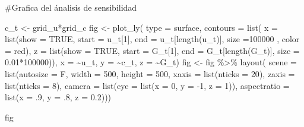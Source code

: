 \documentclass[
  us-letterpaper,
]{scrreprt}
\newenvironment{Shaded}{\begin{snugshade}}{\end{snugshade}}
\newcommand{\AttributeTok}[1]{\textcolor[rgb]{0.40,0.45,0.13}{#1}}
\newcommand{\CommentTok}[1]{\textcolor[rgb]{0.37,0.37,0.37}{#1}}
\newcommand{\ConstantTok}[1]{\textcolor[rgb]{0.56,0.35,0.01}{#1}}
\newcommand{\DecValTok}[1]{\textcolor[rgb]{0.68,0.00,0.00}{#1}}
\newcommand{\FloatTok}[1]{\textcolor[rgb]{0.68,0.00,0.00}{#1}}
\newcommand{\FunctionTok}[1]{\textcolor[rgb]{0.28,0.35,0.67}{#1}}
\newcommand{\NormalTok}[1]{\textcolor[rgb]{0.00,0.23,0.31}{#1}}
\newcommand{\OtherTok}[1]{\textcolor[rgb]{0.00,0.23,0.31}{#1}}
\newcommand{\SpecialCharTok}[1]{\textcolor[rgb]{0.37,0.37,0.37}{#1}}
\newcommand{\StringTok}[1]{\textcolor[rgb]{0.13,0.47,0.30}{#1}}
\theoremstyle{plain}
\theoremstyle{plain}
\theoremstyle{definition}
\theoremstyle{remark}
\begin{document}
\begin{Shaded}
\begin{Highlighting}[]
\CommentTok{\#Grafica del ánalisis de sensibilidad}

\NormalTok{c\_t }\OtherTok{\textless{}{-}}\NormalTok{ grid\_u}\SpecialCharTok{*}\NormalTok{grid\_c}
\NormalTok{fig }\OtherTok{\textless{}{-}} \FunctionTok{plot\_ly}\NormalTok{(}
  \AttributeTok{type =} \StringTok{\textquotesingle{}surface\textquotesingle{}}\NormalTok{,}
  \AttributeTok{contours =} \FunctionTok{list}\NormalTok{(}
    \AttributeTok{x =} \FunctionTok{list}\NormalTok{(}\AttributeTok{show =} \ConstantTok{TRUE}\NormalTok{, }\AttributeTok{start =}\NormalTok{ u\_t[}\DecValTok{1}\NormalTok{], }
             \AttributeTok{end =}\NormalTok{ u\_t[}\FunctionTok{length}\NormalTok{(u\_t)], }
             \AttributeTok{size =}\DecValTok{100000}\NormalTok{ , }\AttributeTok{color =} \StringTok{\textquotesingle{}red\textquotesingle{}}\NormalTok{),}
    \AttributeTok{z =} \FunctionTok{list}\NormalTok{(}\AttributeTok{show =} \ConstantTok{TRUE}\NormalTok{, }\AttributeTok{start =}\NormalTok{ G\_t[}\DecValTok{1}\NormalTok{], }
             \AttributeTok{end =}\NormalTok{ G\_t[}\FunctionTok{length}\NormalTok{(G\_t)], }
             \AttributeTok{size =} \FloatTok{0.01}\SpecialCharTok{*}\DecValTok{100000}\NormalTok{)),}
  \AttributeTok{x =} \SpecialCharTok{\textasciitilde{}}\NormalTok{u\_t,}
  \AttributeTok{y =} \SpecialCharTok{\textasciitilde{}}\NormalTok{c\_t,}
  \AttributeTok{z =} \SpecialCharTok{\textasciitilde{}}\NormalTok{G\_t)}
\NormalTok{fig }\OtherTok{\textless{}{-}}\NormalTok{ fig }\SpecialCharTok{\%\textgreater{}\%} \FunctionTok{layout}\NormalTok{(}
  \AttributeTok{scene =} \FunctionTok{list}\NormalTok{(}\AttributeTok{autosize =}\NormalTok{ F, }\AttributeTok{width =} \DecValTok{500}\NormalTok{, }\AttributeTok{height =} \DecValTok{500}\NormalTok{,}
    \AttributeTok{xaxis =} \FunctionTok{list}\NormalTok{(}\AttributeTok{nticks =} \DecValTok{20}\NormalTok{),}
    \AttributeTok{zaxis =} \FunctionTok{list}\NormalTok{(}\AttributeTok{nticks =} \DecValTok{8}\NormalTok{),}
    \AttributeTok{camera =} \FunctionTok{list}\NormalTok{(}\AttributeTok{eye =} \FunctionTok{list}\NormalTok{(}\AttributeTok{x =} \DecValTok{0}\NormalTok{, }
                             \AttributeTok{y =} \SpecialCharTok{{-}}\DecValTok{1}\NormalTok{, }\AttributeTok{z =} \DecValTok{1}\NormalTok{)),}
    \AttributeTok{aspectratio =} \FunctionTok{list}\NormalTok{(}\AttributeTok{x =}\NormalTok{ .}\DecValTok{9}\NormalTok{, }\AttributeTok{y =}\NormalTok{ .}\DecValTok{8}\NormalTok{, }\AttributeTok{z =} \FloatTok{0.2}\NormalTok{)))}

\NormalTok{fig}
\end{Highlighting}
\end{Shaded}
\end{document}
